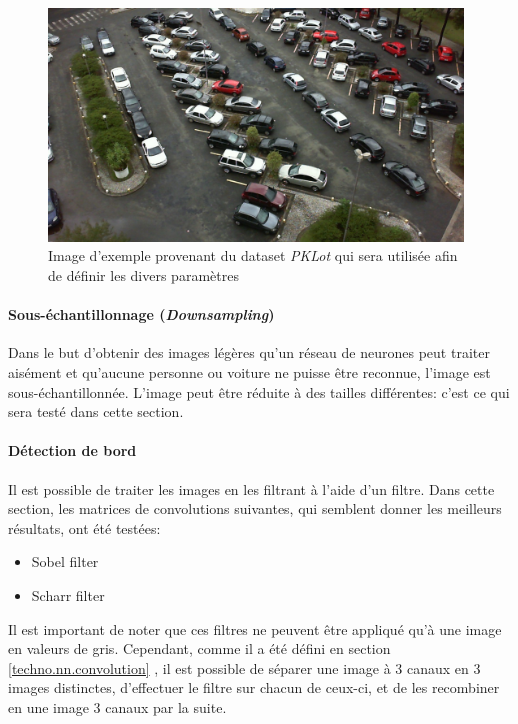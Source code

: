 \begin{figure}[ht]
    \includegraphics[width=110mm]{img/conception/pklot_park.jpg}
    \centering
    \caption{Image d'exemple provenant du dataset \textit{PKLot} qui sera utilisée afin de définir les divers paramètres}
    \label{fig:pklot-park}
\end{figure}


\paragraph{Sous-échantillonnage (\textit{Downsampling})}
Dans le but d'obtenir des images légères qu'un réseau de neurones peut traiter aisément et qu'aucune personne ou voiture ne puisse être reconnue, l'image est sous-échantillonnée. L'image peut être réduite à des tailles différentes: c'est ce qui sera testé dans cette section.

\paragraph{Détection de bord}
Il est possible de traiter les images en les filtrant à l'aide d'un filtre. Dans cette section, les matrices de convolutions suivantes, qui semblent donner les meilleurs résultats, ont été testées:
\begin{itemize}
    \item Sobel filter
    \item Scharr filter
\end{itemize} 

Il est important de noter que ces filtres ne peuvent être appliqué qu'à une image en valeurs de gris. Cependant, comme il a été défini en section \ref{techno.nn.convolution} , il est possible de séparer une image à 3 canaux en 3 images distinctes, d'effectuer le filtre sur chacun de ceux-ci, et de les recombiner en une image 3 canaux par la suite. 

